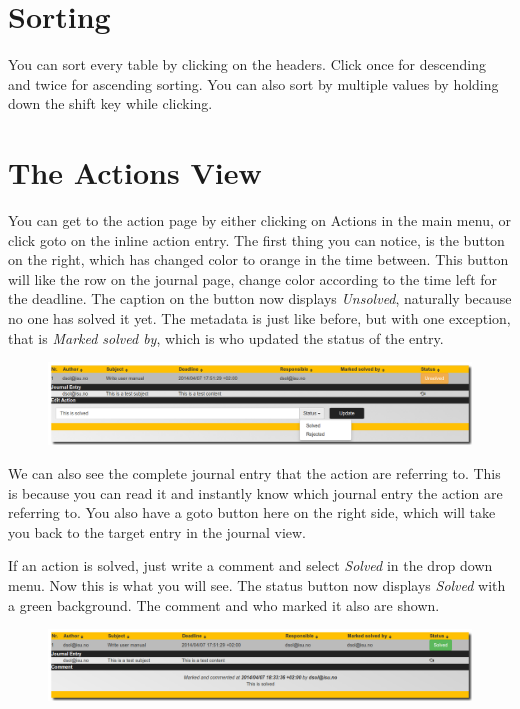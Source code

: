 \documentclass[letterpaper,10pt,english]{sphinxmanual}
\begin{document}
\section{Sorting}
\label{User manual:sorting}
You can sort every table by clicking on the headers. Click once for descending and twice for ascending sorting. You can also sort by multiple values by holding down the shift key while clicking.


\section{The Actions View}
\label{User manual:the-actions-view}
You can get to the action page by either clicking on Actions in the main menu, or click goto on the inline action entry. The first thing you can notice, is the button on the right, which has changed color to orange in the time between. This button will like the row on the journal page, change color according to the time left for the deadline. The caption on the button now displays \emph{Unsolved}, naturally because no one has solved it yet. The metadata is just like before, but with one exception, that is \emph{Marked solved by}, which is who updated the status of the entry.
\begin{figure}[htbp]
\centering

\includegraphics{actions6.png}
\end{figure}

We can also see the complete journal entry that the action are referring to. This is because you can read it and instantly know which journal entry the action are referring to. You also have a goto button here on the right side, which will take you back to the target entry in the journal view.

If an action is solved, just write a comment and select \emph{Solved} in the drop down menu. Now this is what you will see. The status button now displays \emph{Solved} with a green background. The comment and who marked it also are shown.
\begin{figure}[htbp]
\centering

\includegraphics{actions5.png}
\end{figure}
\end{document}
